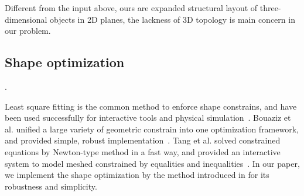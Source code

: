 Different from the input above, ours are expanded structural layout of three-dimensional objects in 2D planes, the lackness of 3D topology is main concern in our problem.

\subsection{Shape optimization}
{\color{red}{Add more?}}.

Least square fitting is the common method to enforce shape constrains, and have been used successfully for interactive tools and physical simulation~\cite{Botsch:2006:PCP:1281957.1281959,Igarashi:2005:ASM:1186822.1073323}. Bouaziz et al.  unified a large variety of geometric constrain into one optimization framework, and provided simple, robust implementation~\cite{Bouaziz:2012:SSD:2346796.2346802}. Tang et al. solved constrained equations by Newton-type method in a fast way, and provided an interactive system to model meshed constrained by equalities and inequalities~\cite{Tang:2014:FPM:2601097.2601213}. In our paper, we implement the shape optimization by the method introduced in \cite{Bouaziz:2012:SSD:2346796.2346802} for its robustness and simplicity.